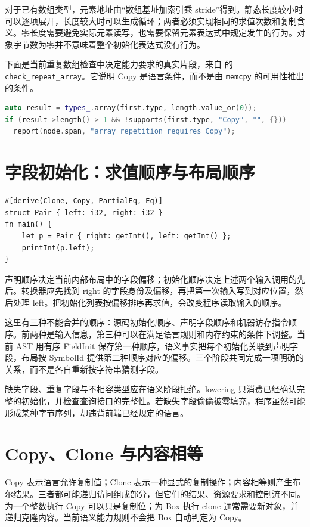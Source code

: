 对于已有数组类型，元素地址由“数组基址加索引乘 stride”得到。静态长度较小时可以逐项展开，长度较大时可以生成循环；两者必须实现相同的求值次数和复制含义。零长度需要避免实际元素读写，也需要保留元素表达式中规定发生的行为。对象字节数为零并不意味着整个初始化表达式没有行为。

下面是当前重复数组检查中决定能力要求的真实片段，来自  的 \texttt{check\_repeat\_array}。它说明 Copy 是语言条件，而不是由 \texttt{memcpy} 的可用性推出的条件。
\begin{lstlisting}[language=C++,caption={当前重复数组的能力条件}]
auto result = types_.array(first.type, length.value_or(0));
if (result->length() > 1 && !supports(first.type, "Copy", "", {}))
  report(node.span, "array repetition requires Copy");
\end{lstlisting}

\section{字段初始化：求值顺序与布局顺序}
\begin{lstlisting}[language=Rustless,caption={源码字段顺序与声明字段顺序可以不同}]
#[derive(Clone, Copy, PartialEq, Eq)]
struct Pair { left: i32, right: i32 }
fn main() {
    let p = Pair { right: getInt(), left: getInt() };
    printInt(p.left);
}
\end{lstlisting}
声明顺序决定当前内部布局中的字段偏移；初始化顺序决定上述两个输入调用的先后。转换器应先找到 right 的字段身份及偏移，再把第一次输入写到对应位置，然后处理 left。把初始化列表按偏移排序再求值，会改变程序读取输入的顺序。

这里有三种不能合并的顺序：源码初始化顺序、声明字段顺序和机器访存指令顺序。前两种是输入信息，第三种可以在满足语言规则和内存约束的条件下调整。当前 AST 用有序 FieldInit 保存第一种顺序，语义事实把每个初始化关联到声明字段，布局按 SymbolId 提供第二种顺序对应的偏移。三个阶段共同完成一项明确的关系，而不是各自重新按字符串猜测字段。

缺失字段、重复字段与不相容类型应在语义阶段拒绝。lowering 只消费已经确认完整的初始化，并检查查询接口的完整性。若缺失字段偷偷被零填充，程序虽然可能形成某种字节序列，却违背前端已经规定的语言。

\section{Copy、Clone 与内容相等}
Copy 表示语言允许复制值；Clone 表示一种显式的复制操作；内容相等则产生布尔结果。三者都可能递归访问组成部分，但它们的结果、资源要求和控制流不同。为一个整数执行 Copy 可以只是复制位；为 Box 执行 clone 通常需要新对象，并递归克隆内容。当前语义能力规则不会把 Box 自动判定为 Copy。

